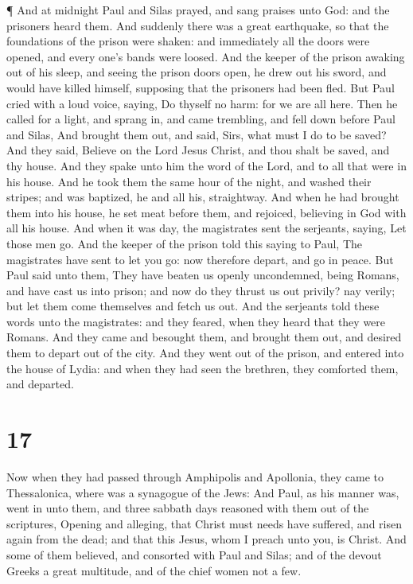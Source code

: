  ¶ And at midnight Paul and Silas prayed, and sang praises
unto God: and the prisoners heard them.  And suddenly there
was a great earthquake, so that the foundations of the prison were
shaken: and immediately all the doors were opened, and every one's bands
were loosed.  And the keeper of the prison awaking out of
his sleep, and seeing the prison doors open, he drew out his sword, and
would have killed himself, supposing that the prisoners had been fled.
 But Paul cried with a loud voice, saying, Do thyself no
harm: for we are all here.  Then he called for a light, and
sprang in, and came trembling, and fell down before Paul and Silas,
 And brought them out, and said, Sirs, what must I do to be
saved?  And they said, Believe on the Lord Jesus Christ,
and thou shalt be saved, and thy house.  And they spake
unto him the word of the Lord, and to all that were in his house.
 And he took them the same hour of the night, and washed
their stripes; and was baptized, he and all his, straightway.
 And when he had brought them into his house, he set meat
before them, and rejoiced, believing in God with all his house.
 And when it was day, the magistrates sent the serjeants,
saying, Let those men go.  And the keeper of the prison
told this saying to Paul, The magistrates have sent to let you go: now
therefore depart, and go in peace.  But Paul said unto
them, They have beaten us openly uncondemned, being Romans, and have
cast us into prison; and now do they thrust us out privily? nay verily;
but let them come themselves and fetch us out.  And the
serjeants told these words unto the magistrates: and they feared, when
they heard that they were Romans.  And they came and
besought them, and brought them out, and desired them to depart out of
the city.  And they went out of the prison, and entered
into the house of Lydia: and when they had seen the brethren, they
comforted them, and departed.

\hypertarget{section-16}{%
\section{17}\label{section-16}}

 Now when they had passed through Amphipolis and Apollonia,
they came to Thessalonica, where was a synagogue of the Jews:
 And Paul, as his manner was, went in unto them, and three
sabbath days reasoned with them out of the scriptures, 
Opening and alleging, that Christ must needs have suffered, and risen
again from the dead; and that this Jesus, whom I preach unto you, is
Christ.  And some of them believed, and consorted with Paul
and Silas; and of the devout Greeks a great multitude, and of the chief
women not a few.

